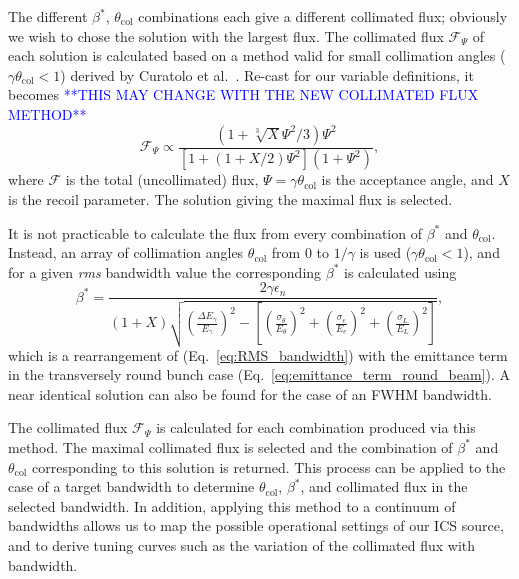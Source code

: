 \documentclass[../main.tex]{subfiles}
\begin{document}
The different $\beta^{*}$, $\theta_{\mathrm{col}}$ combinations each give a different collimated flux; obviously we wish to chose the solution with the largest flux. The collimated flux $\mathcal{F}_{\Psi}$ of each solution is calculated based on a method valid for small collimation angles ($\gamma\theta_{\mathrm{col}} < 1$) derived by Curatolo et al.~\cite{curatolo2017analytical}. Re-cast for our variable definitions, it becomes
\textcolor{blue}{**THIS MAY CHANGE WITH THE NEW COLLIMATED FLUX METHOD**}
\begin{equation}
\mathcal{F}_{\Psi}\propto \frac{\left(1+\sqrt[3]{X}\Psi^{2}/3\right)\Psi^{2}}{\left[1+\left(1+X/2\right)\Psi^{2}\right]\left(1+\Psi^{2}\right)}, 
\label{eq:curatolo_collimated_flux}
\end{equation}
where $\mathcal{F}$ is the total (uncollimated) flux, $\Psi = \gamma\theta_{\mathrm{col}}$ is the acceptance angle, and $X$ is the recoil parameter. The solution giving the maximal flux is selected.

It is not practicable to calculate the flux from every combination of $\beta^{*}$ and $\theta_{\mathrm{col}}$. Instead, an array of collimation angles $\theta_{\mathrm{col}}$ from 0 to $1/\gamma$ is used ($\gamma\theta_{\mathrm{col}}<1$), and for a given \textit{rms} bandwidth value the corresponding $\beta^*$ is calculated using
\begin{equation}
\beta^{*} = \frac{2\gamma\epsilon_{n}}{\left(1+X\right)\sqrt{\left(\frac{\Delta E_{\gamma}}{E_{\gamma}}\right)^{2}-\left[\left(\frac{\sigma_{\theta}}{E_{\theta}}\right)^{2}+\left(\frac{\sigma_{e}}{E_{e}}\right)^{2}+\left(\frac{\sigma_{L}}{E_{L}}\right)^{2}\right]}},
\label{eq:beta_star_round_beam}
\end{equation}
which is a rearrangement of (Eq.~\ref{eq:RMS_bandwidth}) with the emittance term in the transversely round bunch case (Eq.~\ref{eq:emittance_term_round_beam}). A near identical solution can also be found for the case of an FWHM bandwidth. 

The collimated flux $\mathcal{F}_{\Psi}$ is calculated for each combination produced via this method. The maximal collimated flux is selected and the combination of $\beta^{*}$ and $\theta_{\mathrm{col}}$ corresponding to this solution is returned. This process can be applied to the case of a target bandwidth to determine $\theta_{\mathrm{col}}$, $\beta^{*}$, and collimated flux in the selected bandwidth. In addition, applying this method to a continuum of bandwidths allows us to map the possible operational settings of our ICS source, and to derive tuning curves such as the variation of the collimated flux with bandwidth.
\end{document}
